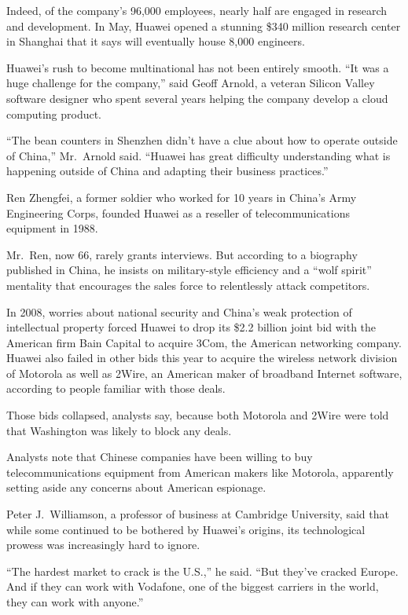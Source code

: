 ﻿\documentclass[12pt]{article}
\begin{document}
Indeed, of the company's 96,000 employees, nearly half are engaged in research and development. In
May, Huawei opened a stunning \$340 million research center in Shanghai that it says will eventually
house 8,000 engineers.

Huawei's rush to become multinational has not been entirely smooth. ``It was a huge challenge for
the company,'' said Geoff Arnold, a veteran Silicon Valley software designer who spent several years
helping the company develop a cloud computing product.

``The bean counters in Shenzhen didn't have a clue about how to operate outside of China,''
Mr.~Arnold said. ``Huawei has great difficulty understanding what is happening outside of China and
adapting their business practices.''

Ren Zhengfei, a former soldier who worked for 10 years in China's Army Engineering Corps, founded
Huawei as a reseller of telecommunications equipment in 1988.

Mr.~Ren, now 66, rarely grants interviews. But according to a biography published in China, he
insists on military-style efficiency and a ``wolf spirit'' mentality that encourages the sales force
to relentlessly attack competitors.

In 2008, worries about national security and China's weak protection of intellectual property forced
Huawei to drop its \$2.2 billion joint bid with the American firm Bain Capital to acquire 3Com, the
American networking company. Huawei also failed in other bids this year to acquire the wireless
network division of Motorola as well as 2Wire, an American maker of broadband Internet software,
according to people familiar with those deals.

Those bids collapsed, analysts say, because both Motorola and 2Wire were told that Washington was
likely to block any deals.

Analysts note that Chinese companies have been willing to buy telecommunications equipment from
American makers like Motorola, apparently setting aside any concerns about American espionage.

Peter J.~Williamson, a professor of business at Cambridge University, said that while some continued
to be bothered by Huawei's origins, its technological prowess was increasingly hard to ignore.

``The hardest market to crack is the U.S.,'' he said. ``But they've cracked Europe. And if they can
work with Vodafone, one of the biggest carriers in the world, they can work with anyone.''
\end{document}
